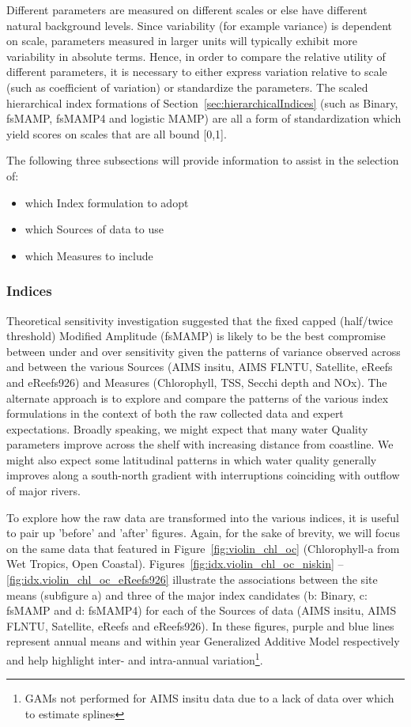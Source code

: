 Different parameters are measured on different scales or else have different natural background
levels.  Since variability (for example variance) is dependent on scale, parameters measured in
larger units will typically exhibit more variability in absolute terms.  Hence, in order to compare
the relative utility of different parameters, it is necessary to either express variation relative
to scale (such as coefficient of variation) or standardize the parameters.  The scaled hierarchical
index formations of Section~\ref{sec:hierarchicalIndices} (such as Binary, fsMAMP, fsMAMP4 and
logistic MAMP) are all a form of standardization which yield scores on scales that are all bound [0,1].

The following three subsections will provide information to assist in the selection of:
\begin{itemize}
\item which Index formulation to adopt
\item which Sources of data to use
\item which Measures to include
\end{itemize}


\subsubsection{Indices}

Theoretical sensitivity investigation suggested that the fixed capped (half/twice threshold)
Modified Amplitude (fsMAMP) is likely to be the best compromise between under and over sensitivity
given the patterns of variance observed across and between the various Sources (AIMS insitu, AIMS
FLNTU, Satellite, eReefs and eReefs926) and Measures (Chlorophyll, TSS, Secchi depth and NOx).  The
alternate approach is to explore and compare the patterns of the various index formulations in the
context of both the raw collected data and expert expectations.  Broadly speaking, we might expect
that many water Quality parameters improve across the shelf with increasing distance from coastline.
We might also expect some latitudinal patterns in which water quality generally improves along a
south-north gradient with interruptions coinciding with outflow of major rivers.


To explore how the raw data are transformed into the various indices, it is useful to pair up
'before' and 'after' figures.  Again, for the sake of brevity, we will focus on the same data that
featured in Figure~\ref{fig:violin_chl_oc} (Chlorophyll-a from Wet Tropics, Open Coastal).
Figures~\ref{fig:idx.violin_chl_oc_niskin} -- \ref{fig:idx.violin_chl_oc_eReefs926} illustrate the
associations between the site means (subfigure a) and three of the major index candidates (b:
Binary, c: fsMAMP and d: fsMAMP4) for each of the Sources of data (AIMS insitu, AIMS FLNTU,
Satellite, eReefs and eReefs926).  In these figures, purple and blue lines represent annual means
and within year Generalized Additive Model \citep[][]{Wood-2006-2006} respectively and help
highlight inter- and intra-annual variation\footnote{GAMs not performed for AIMS insitu data due to
a lack of data over which to estimate splines}.

